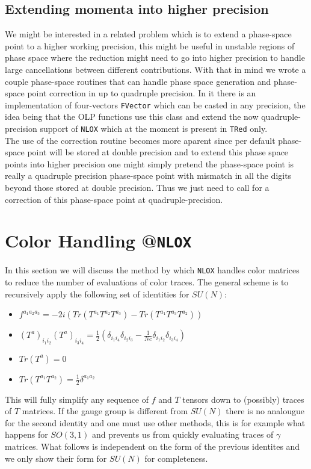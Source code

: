 \documentclass[a4paper]{article}
\begin{document}
\subsection{Extending momenta into higher precision}
We might be interested in a related problem which is to extend a phase-space point to 
a higher working precision, this might be useful in unstable regions of phase space 
where the reduction might need to go into higher precision to handle large cancellations between 
different contributions. With that in mind we wrote a couple phase-space routines that can handle 
phase space generation and phase-space point correction in up to quadruple precision.
In it there is an implementation of four-vectors \texttt{FVector} which can be casted 
in any precision, the idea being that the OLP functions use this class and extend the now 
quadruple-precision support of \texttt{NLOX} which at the moment is present in \texttt{TRed} only.\\

The use of the correction routine becomes more aparent since per default phase-space point 
will be stored at double precision and to extend this phase space points into higher precision
one might simply pretend the phase-space point is really a quadruple precision phase-space point 
with mismatch in all the digits beyond those stored at double precision. Thus we just need to call 
for a correction of this phase-space point at quadruple-precision.



\newpage
\section{Color Handling @\texttt{NLOX}}
In this section we will discuss the method by which \texttt{NLOX} handles color matrices to reduce the number 
of evaluations of color traces. The general scheme is to recursively apply the following set of identities for 
$SU(N)$:

\begin{itemize}
 \item $f^{a_1a_2a_3} = -2i(Tr(T^{a_1} T^{a_2} T^{a_3})-Tr(T^{a_1} T^{a_3} T^{a_2}))$
 \item $(T^a)_{i_1i_2}(T^a)_{i_3i_4} = \frac{1}{2}\left(\delta_{i_1i_4}\delta_{i_2i_3} - \frac{1}{Nc}\delta_{i_1i_2}\delta_{i_3i_4}\right)$
 \item $Tr(T^a) = 0$
 \item $Tr(T^{a_1}T^{a_2})=\frac{1}{2}\delta^{a_1 a_2}$
\end{itemize}
This will fully simplify any sequence of $f$ and $T$ tensors down to (possibly) traces of $T$ matrices.
If the gauge group is different from $SU(N)$ there is no analougue for the second identity and one 
must use other methods, this is for example what happens for $SO(3,1)$ and prevents us from 
quickly evaluating traces of $\gamma$ matrices. What follows is independent on the form of the previous 
identites and we only show their form for $SU(N)$ for completeness.
\end{document}
